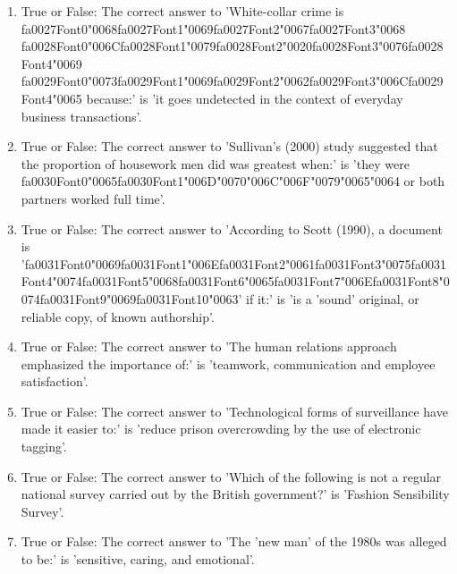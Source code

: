 \documentclass[12pt]{article}
\begin{document}
\begin{enumerate}[label=\arabic*.]
\item True or False: The correct answer to 'White-collar crime is {\csname fa0027Font0\endcsname\char"0068}{\csname fa0027Font1\endcsname\char"0069}{\csname fa0027Font2\endcsname\char"0067}{\csname fa0027Font3\endcsname\char"0068} {\csname fa0028Font0\endcsname\char"006C}{\csname fa0028Font1\endcsname\char"0079}{\csname fa0028Font2\endcsname\char"0020}{\csname fa0028Font3\endcsname\char"0076}{\csname fa0028Font4\endcsname\char"0069} {\csname fa0029Font0\endcsname\char"0073}{\csname fa0029Font1\endcsname\char"0069}{\csname fa0029Font2\endcsname\char"0062}{\csname fa0029Font3\endcsname\char"006C}{\csname fa0029Font4\endcsname\char"0065} because:' is 'it goes undetected in the context of everyday business transactions'.
\item True or False: The correct answer to 'Sullivan's (2000) study suggested that the proportion of housework men did was greatest when:' is 'they were {\csname fa0030Font0\endcsname\char"0065}{\csname fa0030Font1\endcsname\char"006D}{\char"0070}{\char"006C}{\char"006F}{\char"0079}{\char"0065}{\char"0064} or both partners worked full time'.
\item True or False: The correct answer to 'According to Scott (1990), a document is '{\csname fa0031Font0\endcsname\char"0069}{\csname fa0031Font1\endcsname\char"006E}{\csname fa0031Font2\endcsname\char"0061}{\csname fa0031Font3\endcsname\char"0075}{\csname fa0031Font4\endcsname\char"0074}{\csname fa0031Font5\endcsname\char"0068}{\csname fa0031Font6\endcsname\char"0065}{\csname fa0031Font7\endcsname\char"006E}{\csname fa0031Font8\endcsname\char"0074}{\csname fa0031Font9\endcsname\char"0069}{\csname fa0031Font10\endcsname\char"0063}' if it:' is 'is a 'sound' original, or reliable copy, of known authorship'.
\item True or False: The correct answer to 'The human relations approach emphasized the importance of:' is 'teamwork, communication and employee satisfaction'.
\item True or False: The correct answer to 'Technological forms of surveillance have made it easier to:' is 'reduce prison overcrowding by the use of electronic tagging'.
\item True or False: The correct answer to 'Which of the following is not a regular national survey carried out by the British government?' is 'Fashion Sensibility Survey'.
\item True or False: The correct answer to 'The 'new man' of the 1980s was alleged to be:' is 'sensitive, caring, and emotional'.

\end{enumerate}
\end{document}
